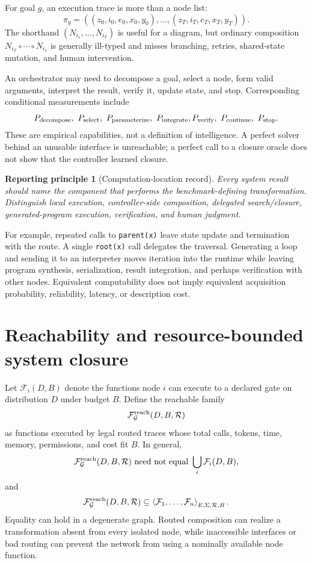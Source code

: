 \documentclass[10pt]{article}
\newtheorem{principle}{Reporting principle}
\begin{document}
For goal $g$, an execution trace is more than a node list:
\[
\pi_g=((z_0,i_0,e_0,x_0,y_0),\ldots,(z_T,i_T,e_T,x_T,y_T)).
\]
The shorthand $(N_{i_1},\ldots,N_{i_T})$ is useful for a diagram, but ordinary composition $N_{i_T}\circ\cdots\circ N_{i_1}$ is generally ill-typed and misses branching, retries, shared-state mutation, and human intervention.

An orchestrator may need to decompose a goal, select a node, form valid arguments, interpret the result, verify it, update state, and stop. Corresponding conditional measurements include
\[
P_{\rm decompose},\ P_{\rm select},\ P_{\rm parameterize},\ P_{\rm integrate},\\
P_{\rm verify},\ P_{\rm continue},\ P_{\rm stop}.
\]
These are empirical capabilities, not a definition of intelligence. A perfect solver behind an unusable interface is unreachable; a perfect call to a closure oracle does not show that the controller learned closure.

\begin{principle}[Computation-location record]
Every system result should name the component that performs the benchmark-defining transformation. Distinguish local execution, controller-side composition, delegated search/closure, generated-program execution, verification, and human judgment.
\end{principle}

For example, repeated calls to \texttt{parent(x)} leave state update and termination with the route. A single \texttt{root(x)} call delegates the traversal. Generating a loop and sending it to an interpreter moves iteration into the runtime while leaving program synthesis, serialization, result integration, and perhaps verification with other nodes. Equivalent computability does not imply equivalent acquisition probability, reliability, latency, or description cost.

\section{Reachability and resource-bounded system closure}

Let $\mathcal F_i(D,B)$ denote the functions node $i$ can execute to a declared gate on distribution $D$ under budget $B$. Define the reachable family
\[
\mathcal F_{\mathcal G}^{\rm reach}(D,B,\mathcal R)
\]
as functions executed by legal routed traces whose total calls, tokens, time, memory, permissions, and cost fit $B$. In general,
\[
\mathcal F_{\mathcal G}^{\rm reach}(D,B,\mathcal R)
\ \text{need not equal}\ \bigcup_i\mathcal F_i(D,B),
\]
and
\[
\mathcal F_{\mathcal G}^{\rm reach}(D,B,\mathcal R)
\subseteq
\left\langle\mathcal F_1,\ldots,\mathcal F_n\right\rangle_{E,\Sigma,\mathcal R,B}.
\]
Equality can hold in a degenerate graph. Routed composition can realize a transformation absent from every isolated node, while inaccessible interfaces or bad routing can prevent the network from using a nominally available node function.
\end{document}

